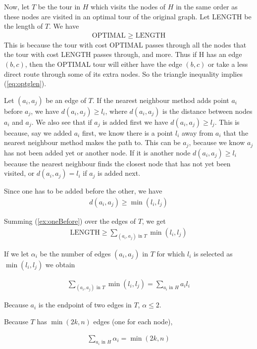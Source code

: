Now, let $T$ be the tour in $H$ which visits the nodes of $H$ in the same order as these nodes are visited in an optimal tour of the original graph. Let LENGTH be the length of $T$. We have 
\begin{align}
\text{OPTIMAL $\geq$ LENGTH} \label{eq:optglen}
\end{align}
This is because the tour with cost OPTIMAL passes through all the nodes that the tour with cost LENGTH passes through, and more. Thus if H has an edge $(b,c)$, then the OPTIMAL tour will either have the edge $(b,c)$ or take a less direct route through some of its extra nodes. So the triangle inequality implies (\ref{eq:optglen}).  
   
Let $(a_i,a_j)$ be an edge of $T$. If the nearest neighbour method adds point $a_i$ before $a_j$, we have $d(a_i,a_j) \geq l_i$, where $d(a_i,a_j)$ is the distance between nodes $a_i$ and $a_j$. We also see that if $a_j$ is added first we have $d(a_i, a_j) \geq l_j$. This is because, say we added $a_i$ first, we know there is a point $l_i$ away from $a_i$ that the nearest neighbour method makes the path to. This can be $a_j$, because we know $a_j$ has not been added yet or another node. If it is another node $d(a_i, a_j) \geq l_i$ because the nearest neighbour finds the closest node that has not yet been visited, or $d(a_i, a_j) = l_i$ if $a_j$ is added next. 

Since one has to be added before the other, we have 
\begin{align}
d(a_i , a_j) \geq \min(l_i, l_j) \label{ex:oneBefore}
\end{align}

Summing (\ref{ex:oneBefore}) over the edges of $T$, we get
\begin{align}
\text{LENGTH} \geq \sum_{(a_i,a_j) \text{ in } T} \min(l_i,l_j)  \label{eq:lengmin}
\end{align}

If we let $\alpha_i$ be the number of edges $(a_i, a_j)$ in $T$ for which $l_i$ is selected as $\min(l_i, l_j)$ we obtain 

\begin{align}
\sum_{(a_i,a_j) \text{ in } T} \min(l_i, l_j) = \sum_{a_i \text{ in } H} a_i l_i  \label{ex:lowBound}
\end{align}

Because $a_i$ is the endpoint of two edges in $T$, $\alpha \leq 2$. 

Because $T$ has $\min(2k,n)$ edges (one for each node),

\begin{align}
\sum_{a_i \text{ in } H} \alpha_i = \min(2k,n) 
\end{align}

